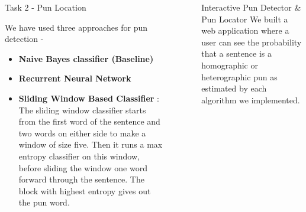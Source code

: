 \documentclass[final]{beamer}
\newlength{\sepwid}
\newlength{\onecolwid}
\newlength{\twocolwid}
\begin{document}
\begin{frame}[t]
\begin{columns}[t]
\begin{column}{\twocolwid}
\begin{columns}[t,totalwidth=\twocolwid]
\begin{column}{\onecolwid}
\begin{block}{Task 2 - Pun Location}
{							We have used three approaches for pun detection - 
							\begin{itemize}
							\item {\textbf{Naive Bayes classifier (Baseline)}}
							\item {\textbf{Recurrent Neural Network} %
							}
							\item {\textbf{Sliding Window Based Classifier} : The sliding window classifier starts from the first word of the sentence and two words on either side to make a window of size five. Then it runs a max entropy classifier on this window, before sliding the window one word forward through the sentence. The block with highest entropy gives out the pun word.}
							\end{itemize}
							\\
						}
					\end{block}
				\end{column}
				\begin{column}{\sepwid}\end{column} %
			\end{columns}
		\end{column}
		\begin{column}{\sepwid}\end{column} %
		\begin{column}{\onecolwid}
            
			\begin{block}{Interactive Pun Detector \& Pun Locator}
				\large{
					We built a web application where a user can see the probability that a sentence is a homographic or heterographic pun as estimated by each algorithm we implemented.
				}


\end{block}
\end{column}
\end{columns}
\end{frame}
\end{document}
